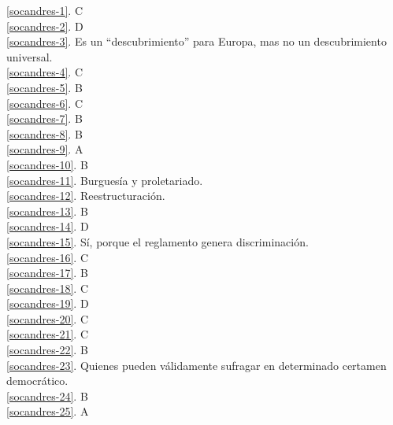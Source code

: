 
\noindent \ref{socandres-1}. C\\
\ref{socandres-2}. D\\
\ref{socandres-3}. Es un ``descubrimiento'' para Europa, mas no un descubrimiento universal.\\
\ref{socandres-4}. C\\ 
\ref{socandres-5}. B \\
\ref{socandres-6}. C\\
\ref{socandres-7}. B\\
\ref{socandres-8}. B\\
\ref{socandres-9}. A \\ 
\ref{socandres-10}. B\\
\ref{socandres-11}. Burguesía y proletariado.\\
\ref{socandres-12}. Reestructuración.\\
\ref{socandres-13}. B\\
\ref{socandres-14}. D\\
\ref{socandres-15}. Sí, porque el reglamento genera discriminación.\\
\ref{socandres-16}. C\\
\ref{socandres-17}. B\\
\ref{socandres-18}. C\\
\ref{socandres-19}. D\\
\ref{socandres-20}. C\\
\ref{socandres-21}. C \\
\ref{socandres-22}. B\\
\ref{socandres-23}. Quienes pueden válidamente sufragar en determinado certamen democrático. \\
\ref{socandres-24}. B \\
\ref{socandres-25}. A \\
